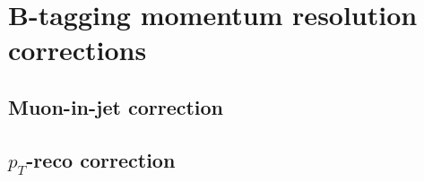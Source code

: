 \section{B-tagging momentum resolution corrections}
\label{app:b-tag-mom-res}
\subsection{Muon-in-jet correction}
\subsection{\texorpdfstring{$p_T$}{Pt}-reco correction}